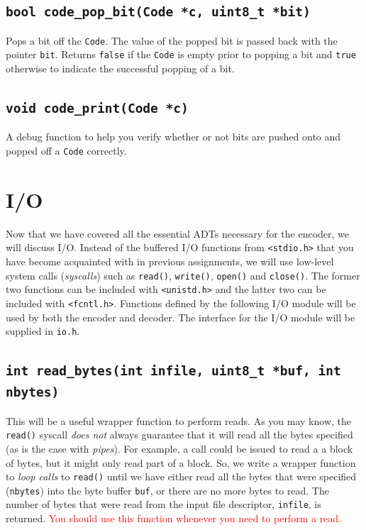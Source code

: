 \documentclass[11pt]{article}
\begin{document}
\subsection{\texttt{bool code\_pop\_bit(Code *c, uint8\_t *bit)}}

Pops a bit off the \texttt{Code}. The value of the popped bit is passed
back with the pointer \texttt{bit}. Returns \texttt{false} if the
\texttt{Code} is empty prior to popping a bit and \texttt{true}
otherwise to indicate the successful popping of a bit.

\subsection{\texttt{void code\_print(Code *c)}}

A debug function to help you verify whether or not bits are pushed onto and
popped off a \texttt{Code} correctly.

\section{I/O}

Now that we have covered all the essential ADTs necessary for the
encoder, we will discuss I/O. Instead of the buffered I/O functions from
\texttt{<stdio.h>} that you have become acquainted with in previous
assignments, we will use low-level system calls (\emph{syscalls}) such as
\texttt{read()}, \texttt{write()}, \texttt{open()} and \texttt{close()}.
The former two functions can be included with \texttt{<unistd.h>} and
the latter two can be included with \texttt{<fcntl.h>}. Functions
defined by the following I/O module will be used by both the encoder and
decoder. The interface for the I/O module will be supplied in
\texttt{io.h}.

\subsection{\texttt{int read\_bytes(int infile, uint8\_t *buf, int
nbytes)}}

This will be a useful wrapper function to perform reads. As you may
know, the \texttt{read()} syscall \emph{does not} always guarantee that
it will read all the bytes specified (as is the case with \emph{pipes}).
For example, a call could be issued to read a a block of bytes, but it
might only read part of a block. So, we write a wrapper function to
\emph{loop calls} to \texttt{read()} until we have either read all the
bytes that were specified (\texttt{nbytes}) into the byte buffer
\texttt{buf}, or there are no more bytes to read. The number of bytes
that were read from the input file descriptor, \texttt{infile}, is
returned. \textcolor{red}{You should use this function whenever you need
to perform a read.}
\end{document}

